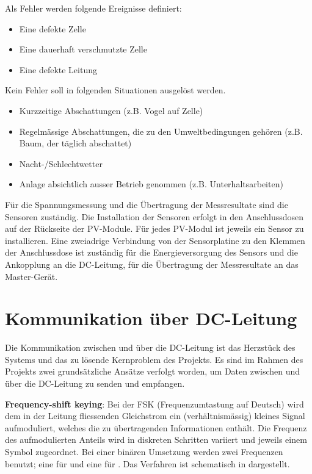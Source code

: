 Als Fehler werden folgende Ereignisse definiert:
\begin{itemize}
    \firmlist
    \item
        Eine defekte Zelle
    \item
        Eine dauerhaft verschmutzte Zelle
    \item
        Eine defekte Leitung
\end{itemize}

Kein Fehler soll in folgenden Situationen ausgel\"ost werden.
\begin{itemize}
    \firmlist
    \item
        Kurzzeitige Abschattungen (z.B. Vogel auf Zelle)
    \item
        Regelm\"assige Abschattungen,  die zu den  Umweltbedingungen geh\"oren
        (z.B. Baum, der t\"aglich abschattet)
    \item
        Nacht-/Schlechtwetter
    \item
        Anlage absichtlich ausser Betrieb genommen (z.B. Unterhaltsarbeiten)
\end{itemize}

F\"ur  die  Spannungsmessung  und  die \"Ubertragung  der  Messresultate  sind
die  Sensoren  zust\"andig. Die  Installation  der  Sensoren  erfolgt  in  den
Anschlussdosen  auf der  R\"uckseite der  PV-Module. F\"ur jedes  PV-Modul ist
jeweils  ein  Sensor  zu  installieren. Eine  zweiadrige  Verbindung  von  der
Sensorplatine  zu den  Klemmen  der Anschlussdose  ist  zust\"andig f\"ur  die
Energieversorgung des Sensors und die  Ankopplung an die DC-Leitung, f\"ur die
\"Ubertragung der Messresultate an das Master-Ger\"at.

\clearpage
\section{Kommunikation \"uber DC-Leitung}
\label{sec:commDCLine}

Die Kommunikation zwischen  \Sensor und \Master \"uber die  DC-Leitung ist das
Herzst\"uck des Systems und das zu l\"osende Kernproblem des Projekts. Es sind
im Rahmen  des Projekts  zwei grunds\"atzliche  Ans\"atze verfolgt  worden, um
Daten  zwischen  \Sensor und  \Master  \"uber  die  DC-Leitung zu  senden  und
empfangen.

\textbf{Frequency-shift keying}: Bei  der FSK (Frequenzumtastung  auf Deutsch)
wird  dem in  der Leitung  fliessenden Gleichstrom  ein (verh\"altnism\"assig)
kleines  Signal aufmoduliert,  welches  die  zu \"ubertragenden  Informationen
enth\"alt. Die  Frequenz   des  aufmodulierten   Anteils  wird   in  diskreten
Schritten variiert  und jeweils  einem Symbol zugeordnet. Bei  einer bin\"aren
Umsetzung  werden  zwei  Frequenzen  benutzt; eine  f\"ur    und  eine
f\"ur  .   Das  Verfahren ist  schematisch  in  
dargestellt.

